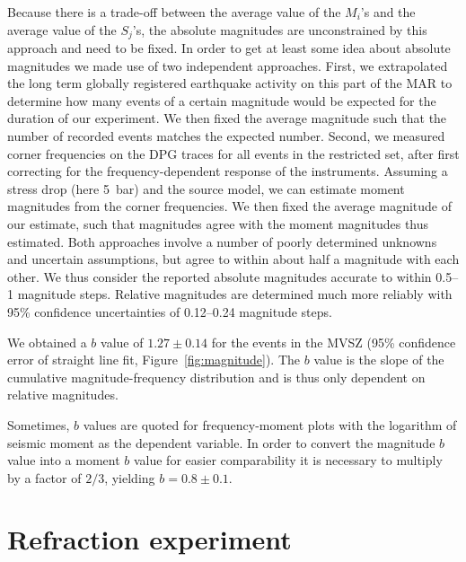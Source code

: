 \documentclass[jgrga]{agu2001} %
\newlength{\tw}
\providecommand{\DIFaddbegin}{} %
\providecommand{\DIFaddend}{} %
\begin{document}
\begin{article}
Because there is a trade-off between the average
value of the $M_i$'s and the average value of the $S_j$'s, the absolute
magnitudes are unconstrained by this approach and need to be fixed.
In order to get at least some idea about absolute magnitudes we made
use of two independent
approaches. First, we extrapolated the long term globally registered earthquake activity on this
part of the MAR to determine how many events of a certain magnitude
would be expected for the duration of our experiment. We then fixed the
average magnitude such that the number of recorded events matches the
expected number.  Second, we measured corner frequencies on the DPG
traces for all
events in the restricted set, after first correcting for the
frequency-dependent response of the instruments. Assuming a stress drop (here 5~bar) and the
\citet{brune70} source model, we can estimate moment
magnitudes from the corner frequencies. We then fixed the average magnitude of our estimate, such
that magnitudes agree with the moment magnitudes thus estimated.
Both approaches involve a number of poorly determined unknowns and
uncertain assumptions, but agree to within about half a magnitude with
each other.  We thus consider the reported absolute magnitudes
accurate to within 0.5--1 magnitude steps.  Relative magnitudes are
determined much more reliably with 95\% confidence uncertainties
of 0.12--0.24 magnitude steps.  

We obtained a $b$ value of  $1.27\pm0.14$ for the events in the MVSZ (95\%
confidence error of straight line fit, Figure~\ref{fig:magnitude}).  
The $b$ value is the slope of
the cumulative magnitude-frequency distribution and is thus only
dependent on relative magnitudes.

Sometimes, $b$ values are quoted for frequency-moment  plots with 
 the logarithm of seismic moment as the dependent variable. In order to convert the magnitude $b$ value into a
 moment $b$ value for easier comparability it  is necessary to multiply by a factor of $2/3$,
yielding $b=0.8\pm0.1$.

\section{Refraction experiment}
\DIFaddbegin \label{sec:refraction}
\DIFaddend 


\end{article}
\end{document}
